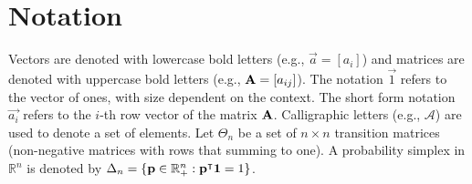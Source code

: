 
\section*{Notation}
\label{sec:notation}

Vectors are denoted with lowercase bold letters (e.g., $\vec{a} = [a_i]$) and matrices are denoted with uppercase bold letters (e.g., $\mathbf{A} = [a_{ij}]$). The notation $\vec{1}$ refers to the vector of ones, with size dependent on the context. The short form notation $\vec{a_i}$ refers to the $i$-th row vector of the matrix $\mathbf{A}$. Calligraphic letters (e.g., $\mathcal{A}$) are used to denote a set of elements. Let $\Theta_n$ be a set of $n \times n$ transition matrices (non-negative matrices with rows that summing to one). A probability simplex in $\mathbb{R}^n$ is denoted by $\Delta_n = \{\mathbf{p} \in \mathbb{R}^n_+ : \mathbf{p}^\intercal \mathbf{1} = 1 \}$.